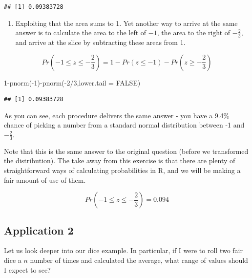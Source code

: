 \documentclass[
]{book}
\newenvironment{Shaded}{\begin{snugshade}}{\end{snugshade}}
\newcommand{\AttributeTok}[1]{\textcolor[rgb]{0.77,0.63,0.00}{#1}}
\newcommand{\ConstantTok}[1]{\textcolor[rgb]{0.00,0.00,0.00}{#1}}
\newcommand{\DecValTok}[1]{\textcolor[rgb]{0.00,0.00,0.81}{#1}}
\newcommand{\FunctionTok}[1]{\textcolor[rgb]{0.00,0.00,0.00}{#1}}
\newcommand{\NormalTok}[1]{#1}
\newcommand{\SpecialCharTok}[1]{\textcolor[rgb]{0.00,0.00,0.00}{#1}}
\providecommand{\tightlist}{%
  \setlength{\itemsep}{0pt}\setlength{\parskip}{0pt}}
\begin{document}
\begin{verbatim}
## [1] 0.09383728
\end{verbatim}

\begin{enumerate}
\def\labelenumi{\arabic{enumi}.}
\setcounter{enumi}{2}
\tightlist
\item
  Exploiting that the area sums to 1. Yet another way to arrive at the same answer is to calculate the area to the left of \(-1\), the area to the right of \(-\frac{2}{3}\), and arrive at the slice by subtracting these areas from 1.
\end{enumerate}

\[Pr\left(-1 \leq z \leq -\frac{2}{3}\right)=1 - Pr(z \leq -1) - Pr\left(z \geq -\frac{2}{3}\right)\]

\begin{Shaded}
\begin{Highlighting}[]
\DecValTok{1}\SpecialCharTok{{-}}\FunctionTok{pnorm}\NormalTok{(}\SpecialCharTok{{-}}\DecValTok{1}\NormalTok{)}\SpecialCharTok{{-}}\FunctionTok{pnorm}\NormalTok{(}\SpecialCharTok{{-}}\DecValTok{2}\SpecialCharTok{/}\DecValTok{3}\NormalTok{,}\AttributeTok{lower.tail =} \ConstantTok{FALSE}\NormalTok{)}
\end{Highlighting}
\end{Shaded}

\begin{verbatim}
## [1] 0.09383728
\end{verbatim}

As you can see, each procedure delivers the same answer - you have a 9.4\% chance of picking a number from a standard normal distribution between -1 and \(-\frac{2}{3}\).

Note that this is the same answer to the original question (before we transformed the distribution). The take away from this exercise is that there are plenty of straightforward ways of calculating probabilities in R, and we will be making a fair amount of use of them.

\[Pr\left(-1 \leq z \leq -\frac{2}{3}\right)=0.094\]

\hypertarget{application-2}{%
\subsection{Application 2}\label{application-2}}

Let us look deeper into our dice example. In particular, if I were to roll two fair dice a \(n\) number of times and calculated the average, what range of values should I expect to see?
\end{document}
